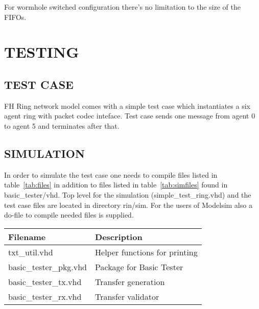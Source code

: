 \documentclass[a4paper,10pt,oneside,final]{article}
\def\deftablecolora{blue!10!white}
\def\deftablecolorb{white}
\begin{document}
\vspace{0.4cm}
\noindent
For wormhole switched configuration there's no limitation to the size
of the FIFOs.



\newpage
\section{TESTING}

\subsection{TEST CASE}

FH Ring network model comes with a simple test case which instantiates
a six agent ring with packet codec inteface. Test case sends one message
from agent 0 to agent 5 and terminates after that.

\subsection{SIMULATION}

In order to simulate the test case one needs to compile files listed
in table~\ref{tab:files} in addition to files listed in
table~\ref{tab:simfiles} found in basic\_tester/vhd. Top level for the
simulation (simple\_test\_ring.vhd) and the test case files are
located in directory rin/sim. For the users of Modelsim also a
do-file to compile needed files is supplied.


\begin{center}
  \rowcolors{3}{\deftablecolora}{\deftablecolorb}

  \label{tab:simfiles}
  \begin{tabularx}{\textwidth}{|lX|}
    \hline
    Filename   & Description\\
    \hline
    txt\_util.vhd          & Helper functions for printing\\
    basic\_tester\_pkg.vhd & Package for Basic Tester\\
    basic\_tester\_tx.vhd  & Transfer generation\\
    basic\_tester\_rx.vhd  & Transfer validator\\
    \hline
  \end{tabularx}  
\end{center}
\end{document}
